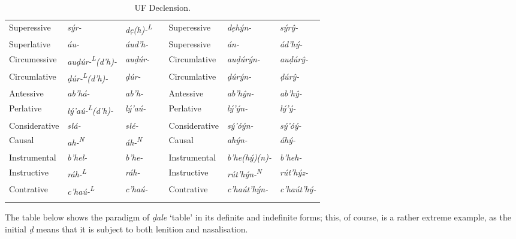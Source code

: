 \documentclass[a4paper, 12pt, twoside, final]{article}
\def \L {\textsuperscript{L}}
\def \N {\textsuperscript{N}}
\let \w \textit
\begin{document}
\begin{longtable}{l|>{\it}l|>{\it}lll|>{\it}l|>{\it}l}
Superessive   & sýr-           & dẹ(h)-\L && Superessive   & dẹhýn-       & sýrŷ-    \\
Superlative   & áu-            & áud’h-   && Superessive   & án-          & ád’hý-   \\ %
Circumessive  & auḍúr-\L(d’h)- & auḍúr-   && Circumlative  & auḍúrýn-     & auḍúrŷ-  \\ %
Circumlative  & ḍúr-\L(d’h)-   & ḍúr-     && Circumlative  & ḍúrýn-       & ḍúrŷ-    \\ %
Antessive     & ab’há-         & ab’h-    && Antessive     & ab’hŷn-      & ab’hŷ-   \\ %
Perlative     & lý’aú-\L(d’h)- & lý’aú-   && Perlative     & lý’ýn-       & lý’ý-    \\ %
Considerative & słá-           & słé-     && Considerative & sý’óýn-      & sý’óý-   \\
Causal        & ah-\N          & áh-\N    && Causal        & ahýn-        & áhý-     \\ %
Instrumental  & b’hel-         & b’he-    && Instrumental  & b’he(hý)(n)- & b’heh-   \\
Instructive   & ráh-\L         & ráh-     && Instructive   & rút’hýn-\N   & rút’hýz- \\
Contrative    & c’haú-\L       & c’haú-   && Contrative    & c’haút’hýn-  & c’haút’hý- \\ %
\noalign{\medskip}
\caption{UF Declension.}\label{tab:table-uf-declension}
\end{longtable}

\noindent The table below shows the paradigm of \w{ḍale} ‘table’ in its definite and indefinite forms; this, of course,
is a rather extreme example, as the initial \w{ḍ} means that it is subject to both lenition and nasalisation.
\end{document}
